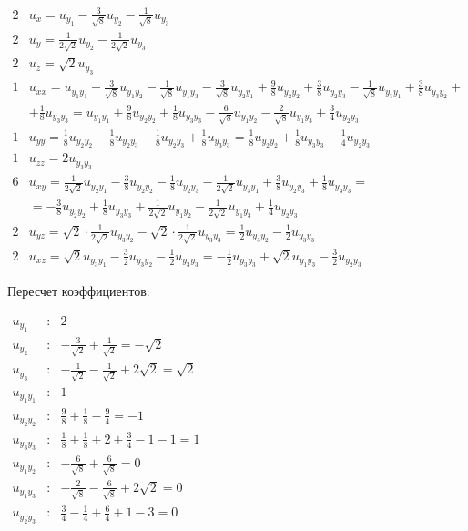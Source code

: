 \documentclass[a4paper,12pt]{article}
\begin{document}
\begin{flushleft}
\(
\begin{array}{r|l}
2 & u_x = u_{y_1} - \frac{3}{\sqrt{8}}u_{y_2} - \frac{1}{\sqrt{8}}u_{y_3} \\
2 & u_y = \frac{1}{2\sqrt{2}}u_{y_2} - \frac{1}{2\sqrt{2}} u_{y_3}  \\
2 & u_z = \sqrt{2}u_{y_3}  \\
1 & u_{xx} = u_{y_1y_1} - \frac{3}{\sqrt{8}}u_{y_1y_2} - \frac{1}{\sqrt{8}}u_{y_1y_3} - \frac{3}{\sqrt{8}}u_{y_2y_1} +\frac{9}{8} u_{y_2y_2} + \frac{3}{8}u_{y_2y_3} -\frac{1}{\sqrt{8}} u_{y_3y_1} + \frac{3}{8}u_{y_3y_2} + \\& + \frac{1}{8} u_{y_3y_3} = u_{y_1y_1} +\frac{9}{8} u_{y_2y_2} +\frac{1}{8} u_{y_3y_3}  - \frac{6}{\sqrt{8}}u_{y_1y_2} - \frac{2}{\sqrt{8}}u_{y_1y_3} + \frac{3}{4}u_{y_2y_3} \\
1 & u_{yy} = \frac{1}{8}u_{y_2y_2} - \frac{1}{8}u_{y_2y_3} - \frac{1}{8}u_{y_2y_3} + \frac{1}{8} u_{y_3y_3} = \frac{1}{8}u_{y_2y_2} + \frac{1}{8} u_{y_3y_3} - \frac{1}{4}u_{y_2y_3}  \\
1 & u_{zz} = 2u_{y_3y_3} \\
6 & u_{xy} = \frac{1}{2\sqrt{2}}u_{y_2y_1} - \frac{3}{8} u_{y_2y_2} - \frac{1}{8}u_{y_2y_3} - \frac{1}{2\sqrt{2}}u_{y_3y_1} + \frac{3}{8}u_{y_2y_3} + \frac{1}{8} u_{y_3y_3} =\\&= - \frac{3}{8} u_{y_2y_2} + \frac{1}{8} u_{y_3y_3} + \frac{1}{2\sqrt{2}}u_{y_1y_2}  - \frac{1}{2\sqrt{2}}u_{y_1y_3} + \frac{1}{4}u_{y_2y_3} \\
2 & u_{yz} = \sqrt{2} \cdot \frac{1}{2\sqrt{2}} u_{y_3y_2} - \sqrt{2} \cdot \frac{1}{2\sqrt{2}} u_{y_3y_3} = \frac{1}{2} u_{y_3y_2} - \frac{1}{2} u_{y_3y_3}  \\
2 & u_{xz} = \sqrt{2} u_{y_3y_1} - \frac{3}{2}u_{y_3y_2} - \frac{1}{2}u_{y_3y_3} =  - \frac{1}{2}u_{y_3y_3} + \sqrt{2} u_{y_1y_3} - \frac{3}{2}u_{y_2y_3} 
\end{array}
\)
\end{flushleft}

Пересчет коэффициентов:
\begin{flushleft}
\(
\begin{array}{rcl}
u_{y_1} & : & 2 \\
u_{y_2} & : & -\frac{3}{\sqrt{2}} + \frac{1}{\sqrt{2}} = -\sqrt{2} \\
u_{y_3} & : & -\frac{1}{\sqrt{2}} - \frac{1}{\sqrt{2}} + 2\sqrt{2}= \sqrt{2}\\
u_{y_1y_1} & : & 1 \\
u_{y_2y_2} & : & \frac{9}{8} + \frac{1}{8} - \frac{9}{4}= -1 \\
u_{y_3y_3} & : & \frac{1}{8} + \frac{1}{8} + 2 + \frac{3}{4} - 1 -1 = 1\\
u_{y_1y_2} & : & -\frac{6}{\sqrt{8}} +\frac{6}{\sqrt{8}} = 0\\
u_{y_1y_3} & : & -\frac{2}{\sqrt{8}} -\frac{6}{\sqrt{8}} + 2\sqrt{2} = 0 \\
u_{y_2y_3} & : & \frac{3}{4} - \frac{1}{4} + \frac{6}{4} + 1 - 3 = 0 
\end{array}
\)
\end{flushleft}
\end{document}
